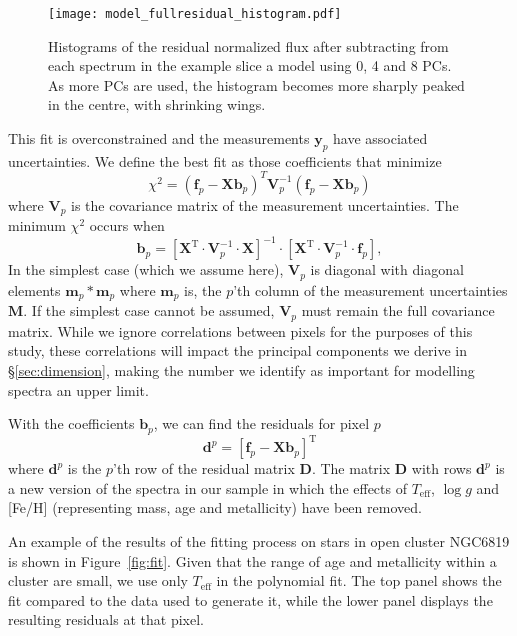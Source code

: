 \documentclass[a4paper,fleqn,usenatbib]{mnras}
\newcommand       \teff     {{T_{\mathrm{eff}}}}
\begin{document}
\begin{figure}
\centering
\texttt{[image: model\_fullresidual\_histogram.pdf]}
\caption{Histograms of the residual normalized flux after subtracting from each spectrum in the example slice a model using 0, 4 and 8 PCs. As more PCs are used, the histogram becomes more sharply peaked in the centre, with shrinking wings.}
\label{fig:residualhist}
\end{figure}

This fit is overconstrained and the measurements $\mathbf{y}_{p}$ have associated uncertainties. We define the best fit as those coefficients that minimize 
\begin{equation}
	\chi^2 = \left(\mathbf{f}_p - \mathbf{X}\mathbf{b}_p\right)^T \mathbf{V}_p^{-1} \left(\mathbf{f}_p - \mathbf{X}\mathbf{b}_p\right)
\end{equation}
where $\mathbf{V}_p$ is the covariance matrix of the measurement uncertainties. The minimum $\chi^2$ occurs when
%
\begin{equation}
\mathbf{b}_{p} = \left[\mathbf{X}^{\mathrm{T}} \cdot \mathbf{V}_{p}^{-1} \cdot \mathbf{X}\right]^{-1} \cdot \left[\mathbf{X}^{\mathrm{T}} \cdot \mathbf{V}_{p}^{-1} \cdot \mathbf{f}_{p}\right],
\label{eqn:coeffs}
\end{equation}
In the simplest case (which we assume here), $\mathbf{V}_p$ is diagonal with diagonal elements $\mathbf{m}_p * \mathbf{m}_p$ where $\mathbf{m}_p$ is, the $p$'th column of the measurement uncertainties $\mathbf{M}$. If the simplest case cannot be assumed, $\mathbf{V}_p$ must remain the full covariance matrix. While we ignore correlations between pixels for the purposes of this study, these correlations will impact the principal components we derive in \S\ref{sec:dimension}, making the number we identify as important for modelling spectra an upper limit.


With the coefficients $\mathbf{b}_{p}$, we can find the residuals for pixel $p$ 
\begin{equation}
	\mathbf{d}^p = \left[\mathbf{f}_{p} - \mathbf{X}\mathbf{b}_{p}\right]^{\mathrm{T}}	
\end{equation}
where $\mathbf{d}^p$ is the $p$'th row of the residual matrix $\mathbf{D}$. The matrix $\mathbf{D}$ with rows $\mathbf{d}^p$ is a new version of the spectra in our sample in which the effects of $\teff$, $\log g$ and [Fe/H] (representing mass, age and metallicity) have been removed.

An example of the results of the fitting process on stars in open cluster NGC6819 is shown in Figure~\ref{fig:fit}. Given that the range of age and metallicity within a cluster are small, we use only $\teff$ in the polynomial fit. The top panel shows the fit compared to the data used to generate it, while the lower panel displays the resulting residuals at that pixel. 
\end{document}

